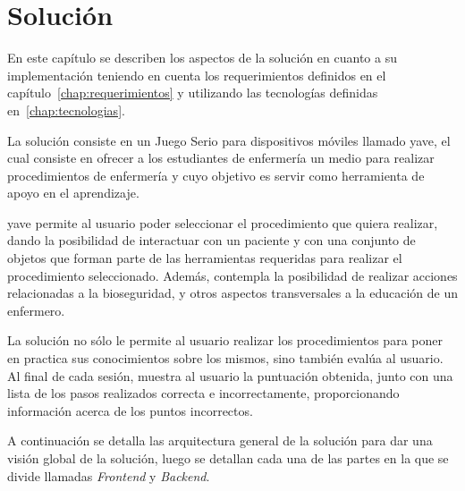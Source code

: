 \chapter{Solución}
\label{chap:solucion}



En este capítulo se describen los aspectos de la solución en cuanto a su
implementación teniendo en cuenta los requerimientos definidos en el
capítulo~\ref{chap:requerimientos} y utilizando las tecnologías definidas
en~\ref{chap:tecnologias}.

La solución consiste en un Juego Serio para dispositivos móviles llamado
\Gls{yave}, el cual consiste en ofrecer a los  estudiantes de enfermería un
medio para realizar procedimientos de enfermería y cuyo objetivo es servir como
herramienta de apoyo en el aprendizaje.

\Gls{yave} permite al usuario poder
seleccionar el procedimiento que quiera realizar, dando la posibilidad de
interactuar con un paciente y con una conjunto de objetos que forman parte de
las herramientas requeridas para realizar el procedimiento seleccionado. Además,
contempla la posibilidad de realizar acciones relacionadas a la bioseguridad, y
otros aspectos transversales a la educación de un enfermero.

La solución no sólo le permite al usuario realizar los procedimientos para poner
en practica sus conocimientos sobre los mismos, sino también evalúa al usuario.
Al final de cada sesión, muestra al usuario la puntuación obtenida, junto con
una lista de los pasos realizados correcta e incorrectamente, proporcionando
información acerca de los puntos incorrectos.

A continuación se detalla las arquitectura general de la solución para 
dar una visión global de la solución, luego se detallan cada una de las partes en 
la que se divide llamadas \emph{Frontend} y \emph{Backend}.






